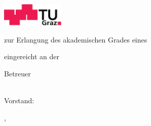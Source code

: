 \begin{titlepage}

{\sffamily

\begin{center}

\includegraphics[width=30mm]{figures/TU_Graz_Logo}

\vfill\vfill\vfill
\vfill\vfill\vfill

\myauthorwithexistingtitles

\vfill\vfill\vfill

{\LARGE\bfseries\mytitlegerman}


\vfill\vfill\vfill
\vfill\vfill\vfill


{\bfseries\large\myworktitlegerman}

zur Erlangung des akademischen Grades eines

\mygradegerman

\mydegreeprogrammegerman


\vfill\vfill\vfill


eingereicht an der

\vfill

{\bfseries\large\myuniversitygerman}


\vfill\vfill\vfill


Betreuer

\mysupervisor

\vfill

\myinstitute\\
Vorstand: \myinstitutehead\\

\vfill



\vfill\vfill\vfill


\mysubmissiontown, \mysubmissionmonth~\mysubmissionyear

\end{center}
}%
\end{titlepage}



